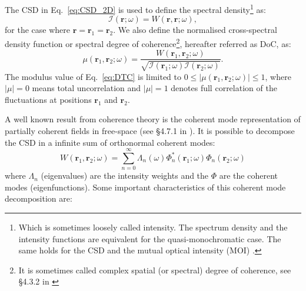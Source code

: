 \documentclass{iucr}              %
\newcommand{\inblue}[1]{{\color{blue}#1}}
\begin{document}
The CSD in Eq.~\ref{eq:CSD_2D} is used to define the spectral density\footnote{Which is sometimes loosely called intensity. The spectrum density and the intensity functions are equivalent for the quasi-monochromatic case. The same holds for the CSD and the mutual optical intensity (MOI) \cite{mandel_wolf}.} as:
\begin{equation}\label{eq:intensity}
    \mathcal{I}(\textbf{r};\omega)=W(\textbf{r},\textbf{r};\omega),
\end{equation}
for the case where $\textbf{r}=\textbf{r}_1=\textbf{r}_2$. We also define the normalised cross-spectral density function or spectral degree of coherence\footnote{It is sometimes called complex spatial (or spectral) degree of coherence, see §4.3.2 in \cite{mandel_wolf}}, \inblue{hereafter referred as DoC}, as:
\begin{equation}
\mu(\textbf{r}_1,\textbf{r}_2;\omega) = \frac{W(\textbf{r}_1,\textbf{r}_2;\omega)}{\sqrt{\mathcal{I}(\textbf{r}_1;\omega) \mathcal{I}(\textbf{r}_2;\omega)}}.
\label{eq:DTC}
\end{equation}
The modulus value of Eq.~\ref{eq:DTC} is limited to $0\leq|\mu(\textbf{r}_1,\textbf{r}_2;\omega)|\leq 1$, where $|\mu|=0$ means total uncorrelation and $|\mu|=1$ denotes full correlation of the fluctuations at positions $\textbf{r}_1$ and $\textbf{r}_2$.

A well known result from coherence theory is the coherent mode representation of partially coherent fields in free-space (see §4.7.1 in \cite{mandel_wolf}). It is possible to decompose the CSD in a infinite sum of orthonormal coherent modes:
\begin{equation}\label{eq:W2DCMD}
W(\textbf{r}_1,\textbf{r}_2;\omega) = \sum_{n=0}^{\infty} \Lambda_n(\omega) \Phi_{n}^*(\textbf{r}_1;\omega) \Phi_{n}(\textbf{r}_2;\omega)
\end{equation}
where $\Lambda_n$ (eigenvalues) are the intensity weights and the $\Phi$ are the coherent modes (eigenfunctions). 
Some important characteristics of this coherent mode decomposition are: 
\end{document}
